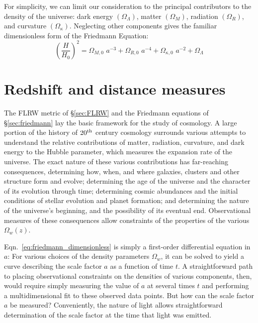 For simplicity, we can limit our consideration to the principal contributors
to the density of the universe:
dark energy $(\Omega_\Lambda)$, matter $(\Omega_M)$, radiation $(\Omega_R)$,
and curvature $(\Omega_\kappa)$.  Neglecting other components gives the
familiar dimensionless form of the Friedmann Equation:
\begin{equation}
  \label{eq:friedmann_dimensionless}
  \left(\frac{H}{H_0}\right)^2
  = \Omega_{M,0}\,\,a^{-3} + \Omega_{R,0}\,\,a^{-4}
  + \Omega_{\kappa,0}\,\,a^{-2} + \Omega_\Lambda
\end{equation}

\section{Redshift and distance measures}
\label{sec:redshift}
The FLRW metric of \S\ref{sec:FLRW} and the Friedmann equations of
\S\ref{sec:friedmann} lay the basic framework for the study of cosmology.
A large portion of
the history of $20^{\rm th}$ century cosmology surrounds various
attempts to understand the relative contributions of matter, radiation,
curvature, and dark energy to the Hubble parameter, which measures
the expansion rate of the universe.  The exact nature of these various
contributions has far-reaching consequences,
determining how, when, and where galaxies, clusters and other structure
form and evolve; determining the age of the universe and the character of
its evolution through time; determining cosmic abundances and 
the initial conditions of stellar evolution
and planet formation; and determining the nature of the universe's beginning,
and the possibility of its eventual end.
Observational measures of these consequences allow constraints of the
properties of the various $\Omega_w(z)$.

Eqn.~\ref{eq:friedmann_dimensionless} is simply a first-order differential
equation in $a$: For various choices of the density parameters $\Omega_w$, it
can be solved to yield a curve describing the scale factor $a$ as a function
of time $t$.  A straightforward path to placing
observational constraints on the densities of
various components, then, would require simply measuring the value of $a$ at
several times $t$ and performing a multidimensional fit to these observed
data points.  But how can the scale factor $a$ be measured?
Conveniently, the nature of light allows straightforward determination
of the scale factor at the time that light was emitted.  


